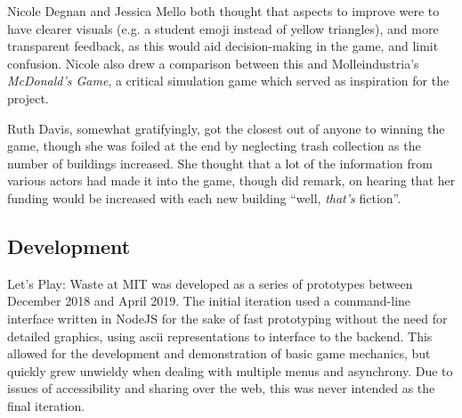 \documentclass[nofonts,nols,justified,nobib]{tufte-book}
\begin{document}
Nicole Degnan and Jessica Mello both thought that aspects to improve were to have clearer visuals (e.g. a student emoji instead of yellow triangles), and more transparent feedback, as this would aid decision-making in the game, and limit confusion. Nicole also drew a comparison between this and Molleindustria's \emph{McDonald's Game}, a critical simulation game which served as inspiration for the project.

Ruth Davis, somewhat gratifyingly, got the closest out of anyone to winning the game, though she was foiled at the end by neglecting trash collection as the number of buildings increased. She thought that a lot of the information from various actors had made it into the game, though did remark, on hearing that her funding would be increased with each new building ``well, \emph{that's} fiction''.

\subsection*{Development}

Let's Play: Waste at MIT was developed as a series of prototypes between December 2018 and April 2019. The initial iteration used a command-line interface written in NodeJS for the sake of fast prototyping without the need for detailed graphics, using ascii representations to interface to the backend. This allowed for the development and demonstration of basic game mechanics, but quickly grew unwieldy when dealing with multiple menus and asynchrony. Due to issues of accessibility and sharing over the web, this was never intended as the final iteration.
\end{document}
